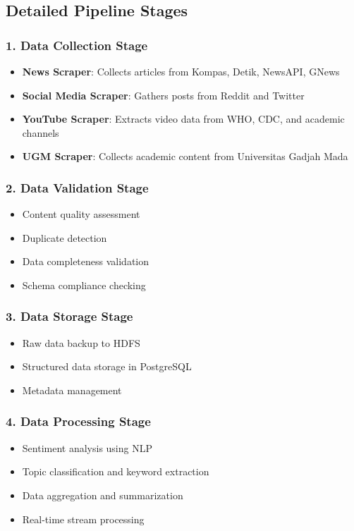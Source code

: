 \documentclass[12pt,a4paper]{article}
\begin{document}
\subsection{Detailed Pipeline Stages}

\subsubsection{1. Data Collection Stage}
\begin{itemize}
    \item \textbf{News Scraper}: Collects articles from Kompas, Detik, NewsAPI, GNews
    \item \textbf{Social Media Scraper}: Gathers posts from Reddit and Twitter
    \item \textbf{YouTube Scraper}: Extracts video data from WHO, CDC, and academic channels
    \item \textbf{UGM Scraper}: Collects academic content from Universitas Gadjah Mada
\end{itemize}

\subsubsection{2. Data Validation Stage}
\begin{itemize}
    \item Content quality assessment
    \item Duplicate detection
    \item Data completeness validation
    \item Schema compliance checking
\end{itemize}

\subsubsection{3. Data Storage Stage}
\begin{itemize}
    \item Raw data backup to HDFS
    \item Structured data storage in PostgreSQL
    \item Metadata management
\end{itemize}

\subsubsection{4. Data Processing Stage}
\begin{itemize}
    \item Sentiment analysis using NLP
    \item Topic classification and keyword extraction
    \item Data aggregation and summarization
    \item Real-time stream processing
\end{itemize}
\end{document}
